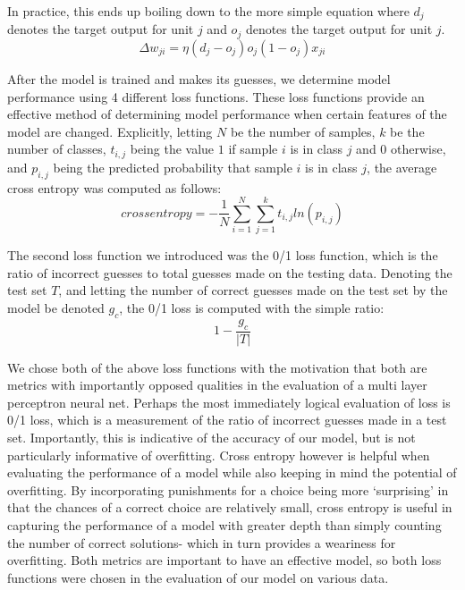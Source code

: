 \documentclass[twoside,11pt]{article}
\begin{document}
In practice, this ends up boiling down to the more simple equation where $d_j$ denotes the target output for unit $j$ and 
$o_j$ denotes the target output for unit $j$.
\begin{equation}
	\Delta w_{ji} = \eta(d_j - o_j)o_j(1-o_j)x_{ji}
\end{equation}

After the model is trained and makes its guesses, we determine model performance using 4 different loss functions.
These loss functions provide an effective method of determining model performance when certain features of the model are changed. Explicitly, letting
$N$ be the number of samples, $k$ be the number of classes, $t_{i,j}$ being the value $1$ if sample $i$ is in class $j$ and $0$ otherwise, and $p_{i,j}$ being the
predicted probability that sample $i$ is in class $j$, the average cross
entropy was computed as follows:
\begin{equation}
	cross entropy = -\frac{1}{N}\sum_{i=1}^{N}\sum_{j=1}^{k}t_{i,j}ln(p_{i,j})
\end{equation}

The second loss function we introduced was the 0/1 loss function, which is the ratio of incorrect guesses to total guesses made on the testing data.
Denoting the test set $T$, and letting the number of correct guesses made on the test set by the model be denoted $g_c$, the 0/1 loss is computed with the simple ratio:
\begin{equation}
	1 - \frac{g_c}{|T|}
\end{equation}

We chose both of the above loss functions with the motivation that both are metrics with importantly opposed qualities in the evaluation of a multi layer perceptron neural net. 
Perhaps the most immediately logical evaluation of loss is 0/1 loss, 
which is a measurement of the ratio of incorrect guesses made in a test set. Importantly, this is indicative of the accuracy of our model, but is not particularly informative of overfitting.
Cross entropy however is helpful when evaluating the performance of a model while also keeping in mind the potential of overfitting. By incorporating punishments for a choice being more 
`surprising' in that the chances of a correct choice are relatively small, cross entropy is useful in capturing the performance of a model with greater depth than simply counting the number of correct solutions- 
which in turn provides a weariness for overfitting.
Both metrics are important to have an effective model, so both loss functions were chosen in the evaluation of our model on various data.
\end{document}
